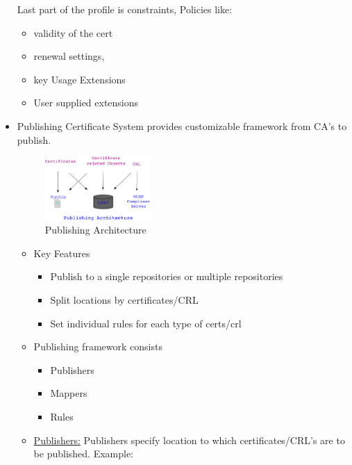 \documentclass[12pt]{report}
\begin{document}
\begin{itemize}
            Last part of the profile is constraints, Policies like:
            \begin{itemize}
                \item validity of the cert
                \item renewal settings, 
                \item key Usage Extensions
                \item User supplied extensions
            \end{itemize}
        \item Publishing 
            Certificate System provides customizable framework from CA's to publish.
            \begin{figure}[h!]
                \centering
                \includegraphics[width=40mm]{Images/publishing3.png}
                \caption{Publishing Architecture}
            \end{figure}
            \begin{itemize}
                \item Key Features
                    \begin{itemize}
                        \item Publish to a single repositories or multiple repositories
                        \item Split locations by certificates/CRL
                        \item Set individual rules for each type of certs/crl
                    \end{itemize}
                \item Publishing framework consists
                    \begin{itemize}
                        \item Publishers
                        \item Mappers
                        \item Rules
                    \end{itemize}
                \item \underline{Publishers:}
                    Publishers specify location to which certificates/CRL's are to be published. 
                        Example: 
                        \begin{itemize}

\end{itemize}
\end{itemize}
\end{itemize}
\end{document}
